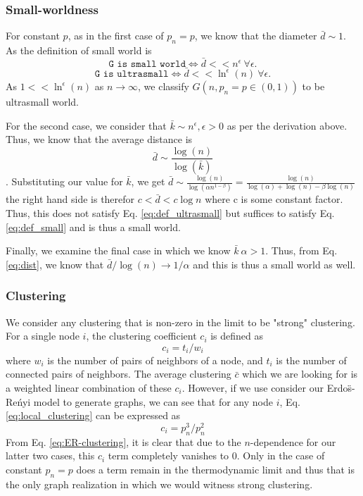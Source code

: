 \documentclass{neu-assignment}
\begin{document}
\subsubsection*{Small-worldness}

For constant $p$, as in the first case of $p_n = p$, we know that the diameter $\bar{d} \sim 1$. As the definition of small world is 
\begin{equation}
    \texttt{G is small world} \Longleftrightarrow \bar{d} << n^\epsilon\ \forall  \epsilon.
    \label{eq:def_small}
\end{equation}
\begin{equation}
    \texttt{G is ultrasmall} \Longleftrightarrow \bar{d} << \ln^\epsilon(n)\  \forall \epsilon.
    \label{eq:def_ultrasmall}
\end{equation}
As $1 << \ln^\epsilon(n)$ as $n \to \infty$, we classify $G(n, p_n = p\in(0,1))$ to be ultrasmall world.
\par
For the second case, we consider that $\bar{k} \sim n^\epsilon, \epsilon >0$ as per the derivation above. Thus, we know that the average distance is
\begin{equation}
    \bar{d} \sim \frac{\log(n)}{\log(\bar{k})}
    \label{eq:dist}
\end{equation}. 
Substituting our value for $\bar{k}$, we get $\bar{d} \sim \frac{\log(n)}{\log(\alpha n^{1-\beta})} = \frac{\log(n)}{\log(\alpha) + \log(n) - \beta\log(n)}$ the right hand side is therefor $c < \bar{d} < c\log{n}$ where c is some constant factor. Thus, this does not satisfy Eq. \ref{eq:def_ultrasmall} but suffices to satisfy Eq. \ref{eq:def_small} and is thus a small world. 
\par
Finally, we examine the final case in which we know $\bar{k} ~ \alpha > 1$. Thus, from Eq. \ref{eq:dist}, we know that $\bar{d}/\log(n) \to 1/\alpha$ and this is thus a small world as well. 
\subsubsection*{Clustering}
We consider any clustering that is non-zero in the limit to be "strong" clustering. 
For a single node $i$, the clustering coefficient $c_i$ is defined as 
\begin{equation}
    c_i = t_i/w_i
    \label{eq:local_clustering}
\end{equation}
where $w_i$ is the number of pairs of neighbors of a node, and $t_i$ is the number of connected pairs of neighbors. The average clustering $\bar{c}$ which we are looking for is a weighted linear combination of these $c_i$.
However, if we use consider our Erdo\"s-Re\'nyi model to generate graphs, we can see that for any node $i$, Eq. \ref{eq:local_clustering} can be expressed as 
\begin{equation}
    c_i = p_n^3/p_n^2
    \label{eq:ER-clustering}
\end{equation}
From Eq. \ref{eq:ER-clustering}, it is clear that due to the $n$-dependence for our latter two cases, this $c_i$ term completely vanishes to 0. Only in the case of constant $p_n = p$ does a term remain in the thermodynamic limit and thus that is the only graph realization in which we would witness strong clustering. 
\end{document}
